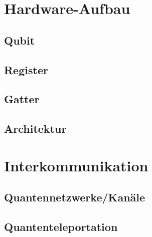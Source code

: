 
\section{Hardware-Aufbau}
\label{sec:Hardware-Aufbau}


\subsection{Qubit}
\label{sec:Qubit}


\subsection{Register}
\label{sec:Register}


\subsection{Gatter}
\label{sec:Gatter}


\subsection{Architektur}
\label{sec:Architektur}




\section{Interkommunikation}
\label{sec:Interkommunikation}


\subsection{Quantennetzwerke/Kan\"ale}
\label{sec:Quantennetzwerke/Kanale}


\subsection{Quantenteleportation}
\label{sec:Quantenteleportation}






